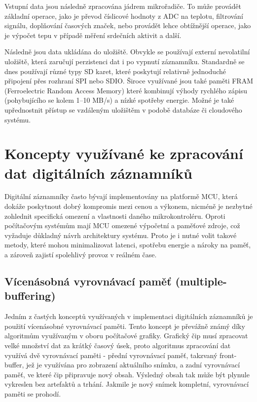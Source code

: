 Vstupní data jsou následně zpracována jádrem mikrořadiče. To může provádět základní operace, jako je převod číslicové hodnoty z ADC na teplotu, filtrování signálu, doplňování časových značek, nebo provádět lehce obtížnější operace, jako je výpočet tepu v případě měření srdečních aktivit a další. 

Následně jsou data ukládána do uložiště. Obvykle se používají externí nevolatilní uložiště, která zaručují perzistenci dat i po vypnutí záznamníku. Standardně se dnes používají různé typy SD karet, které poskytují relativně jednoduché připojení    přes rozhraní SPI nebo SDIO. Široce využívané jsou také paměti FRAM (Ferroelectric Random Access Memory) které kombinují výhody rychlého zápisu (pohybujícího se kolem 1–10 MB/s) a nízké spotřeby energie. Možné je také upřednostnit přístup se vzdáleným uložištěm v podobě databáze či cloudového systému.


\section{Koncepty využívané ke zpracování dat digitálních záznamníků} 
Digitální záznamníky často bývají implementovány na platformě MCU, která dokáže poskytnout dobrý kompromis mezi cenou a výkonem, nicméně je nezbytné zohlednit specifická omezení a vlastnosti daného mikrokontroléru. Oproti počítačovým systémům mají MCU omezené výpočetní a paměťové zdroje, což vyžaduje důkladný návrh architektury systému. Proto je i nutné volit takové metody, které mohou minimalizovat latenci, spotřebu energie a nároky na paměť, a zároveň zajistí spolehlivý provoz v reálném čase.

\subsection{Vícenásobná vyrovnávací paměť (multiple-buffering)}
Jedním z častých konceptů využívaných v implementaci digitálních záznamníků je použití vícenásobné vyrovnávací paměti. Tento koncept je převážně známý díky algoritmům využívaným v oboru počítačové grafiky. Grafický čip musí zpracovat velké množství dat za krátký časový úsek, proto algoritmus zpracování dat využívá dvě vyrovnávací paměti - přední vyrovnávací paměť, takzvaný front-buffer, jež je využívána pro zobrazení aktuálního snímku, a zadní vyrovnávací paměť, ve které čip připravuje nový obsah. Výsledný obsah tak může být plynule vykreslen bez artefaktů a trhání. Jakmile je nový snímek kompletní, vyrovnávací paměti se prohodí. \cite{double_buffering_model}

